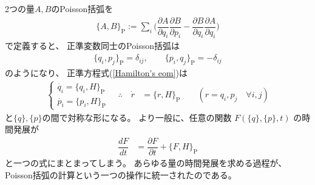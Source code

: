 2つの量$A,B$のPoisson括弧を
\begin{align}
    \{A, B\}_{ \mathrm{P} }
    := \sum_i \bigg(
        \dfrac{ \partial A }{ \partial q_i }
        \dfrac{ \partial B }{ \partial p_i }
    -
        \dfrac{ \partial B }{ \partial q_i }
        \dfrac{ \partial A }{ \partial q_i }
    \bigg)
\end{align}
で定義すると、
正準変数同士のPoisson括弧は
\begin{align}
   \{q_i, p_j\}_{ \mathrm{P} }
   = \delta_{ij}
,\qquad
   \{p_i, q_j\}_{ \mathrm{P} }
   = - \delta_{ij}
\end{align}
のようになり、
正準方程式(\ref{Hamilton's eom})は
\begin{align}
    \begin{cases}
        \dot{q_i} = \{q_i, H\}_{ \mathrm{P} }
      \\
        \dot{p_i} = \{p_i, H\}_{ \mathrm{P} }
      \end{cases}
\quad
\therefore
\quad
    \dot{r} &= \{r, H\}_{ \mathrm{P} }
\qquad
    ( r = q_i, p_j \quad\forall i, j )
\end{align}
と$\{q\},\{p\}$の間で対称な形になる。
より一般に、任意の関数
$F( \{q\},\{p\} , t )$
の時間発展が
\begin{align}
    \dfrac{ d F }{ dt } &= \dfrac{ \partial F }{ \partial t } + \{F, H\}_{ \mathrm{P} } 
\end{align}
と一つの式にまとまってしまう。
あらゆる量の時間発展を求める過程が、
Poisson括弧の計算という一つの操作に統一されたのである。
